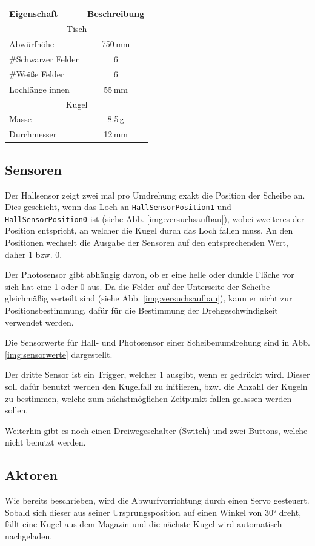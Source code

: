 \begin{center}
\begin{tabular}{lc} 
	\textbf{Eigenschaft} 	& \textbf{Beschreibung}	\\
	\toprule
	\multicolumn{2}{c}{Tisch}\\ 
	\midrule
	Abwürfhöhe 	& 750\,mm \\
	\#Schwarzer Felder 	& 6 \\
	\#Weiße Felder 	& 6 \\
	Lochlänge innen 	& 55\,mm \\
	\midrule 
	\multicolumn{2}{c}{Kugel}\\ 
	\midrule
	Masse 	& 8.5\,g \\
	Durchmesser 	& 12\,mm \\
	\bottomrule
\end{tabular}
\end{center}

\subsection{Sensoren}
Der Hallsensor zeigt zwei mal pro Umdrehung exakt die Position der Scheibe an.
Dies geschieht, wenn das Loch an \texttt{HallSensorPosition1} und \texttt{HallSensorPosition0} ist (siehe Abb. \ref{img:versuchsaufbau}), wobei zweiteres der Position entspricht, an welcher die Kugel durch das Loch fallen muss.
An den Positionen wechselt die Ausgabe der Sensoren auf den entsprechenden Wert, daher 1 bzw. 0.

Der Photosensor gibt abhängig davon, ob er eine helle oder dunkle Fläche vor sich hat eine 1 oder 0 aus.
Da die Felder auf der Unterseite der Scheibe gleichmäßig verteilt sind (siehe Abb. \ref{img:versuchsaufbau}), kann er nicht zur Positionsbestimmung, dafür für die Bestimmung der Drehgeschwindigkeit verwendet werden.

Die Sensorwerte für Hall- und Photosensor einer Scheibenumdrehung sind in Abb. \ref{img:sensorwerte} dargestellt.

Der dritte Sensor ist ein Trigger, welcher 1 ausgibt, wenn er gedrückt wird.
Dieser soll dafür benutzt werden den Kugelfall zu initiieren, bzw. die Anzahl der Kugeln zu bestimmen, welche zum nächstmöglichen Zeitpunkt fallen gelassen werden sollen.

Weiterhin gibt es noch einen Dreiwegeschalter (Switch) und zwei Buttons, welche nicht benutzt werden.

\subsection{Aktoren}
\label{subs:aktoren}
Wie bereits beschrieben, wird die Abwurfvorrichtung durch einen Servo gesteuert.
Sobald sich dieser aus seiner Ursprungsposition auf einen Winkel von 30° dreht, fällt eine Kugel aus dem Magazin und die nächste Kugel wird automatisch nachgeladen.

